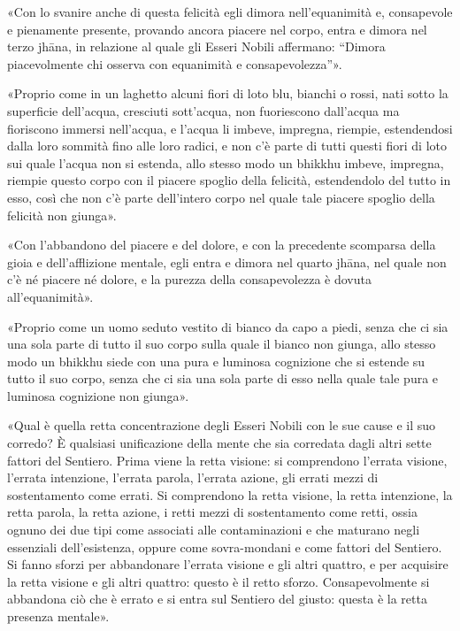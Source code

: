 

«Con lo svanire anche di questa felicità egli dimora nell’equanimità e,
consapevole e pienamente presente, provando ancora piacere nel corpo,
entra e dimora nel terzo jhāna, in relazione al quale gli Esseri Nobili
affermano: “Dimora piacevolmente chi osserva con equanimità e
consapevolezza”».




«Proprio come in un laghetto alcuni fiori di loto blu, bianchi o rossi,
nati sotto la superficie dell’acqua, cresciuti sott’acqua, non
fuoriescono dall’acqua ma fioriscono immersi nell’acqua, e l’acqua li
imbeve, impregna, riempie, estendendosi dalla loro sommità fino alle
loro radici, e non c’è parte di tutti questi fiori di loto sui quale
l’acqua non si estenda, allo stesso modo un bhikkhu imbeve, impregna,
riempie questo corpo con il piacere spoglio della felicità, estendendolo
del tutto in esso, così che non c’è parte dell’intero corpo nel quale
tale piacere spoglio della felicità non giunga».




«Con l’abbandono del piacere e del dolore, e con la precedente scomparsa
della gioia e dell’afflizione mentale, egli entra e dimora nel quarto
jhāna, nel quale non c’è né piacere né dolore, e la purezza della
consapevolezza è dovuta all’equanimità».




«Proprio come un uomo seduto vestito di bianco da capo a piedi, senza
che ci sia una sola parte di tutto il suo corpo sulla quale il bianco
non giunga, allo stesso modo un bhikkhu siede con una pura e luminosa
cognizione che si estende su tutto il suo corpo, senza che ci sia una
sola parte di esso nella quale tale pura e luminosa cognizione non
giunga».




«Qual è quella retta concentrazione degli Esseri Nobili con le sue cause
e il suo corredo? È qualsiasi unificazione della mente che sia corredata
dagli altri sette fattori del Sentiero. Prima viene la retta visione: si
comprendono l’errata visione, l’errata intenzione, l’errata parola,
l’errata azione, gli errati mezzi di sostentamento come errati. Si
comprendono la retta visione, la retta intenzione, la retta parola, la
retta azione, i retti mezzi di sostentamento come retti, ossia ognuno
dei due tipi come associati alle contaminazioni e che maturano negli
essenziali dell’esistenza, oppure come sovra-mondani e come fattori del
Sentiero. Si fanno sforzi per abbandonare l’errata visione e gli altri
quattro, e per acquisire la retta visione e gli altri quattro: questo è
il retto sforzo. Consapevolmente si abbandona ciò che è errato e si
entra sul Sentiero del giusto: questa è la retta presenza mentale».


